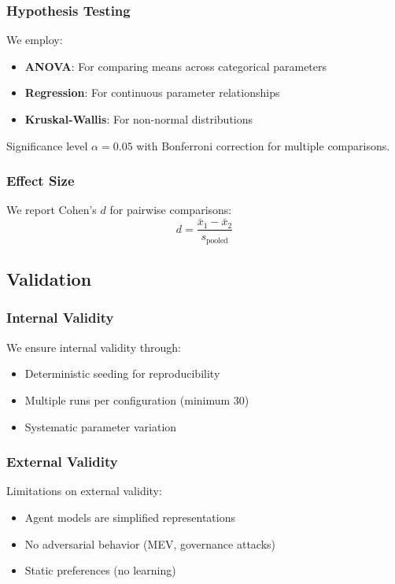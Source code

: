 \subsubsection{Hypothesis Testing}

We employ:
\begin{itemize}
    \item \textbf{ANOVA}: For comparing means across categorical parameters
    \item \textbf{Regression}: For continuous parameter relationships
    \item \textbf{Kruskal-Wallis}: For non-normal distributions
\end{itemize}

Significance level $\alpha = 0.05$ with Bonferroni correction for multiple comparisons.

\subsubsection{Effect Size}

We report Cohen's $d$ for pairwise comparisons:
\begin{equation}
d = \frac{\bar{x}_1 - \bar{x}_2}{s_{\text{pooled}}}
\end{equation}

\subsection{Validation}

\subsubsection{Internal Validity}

We ensure internal validity through:
\begin{itemize}
    \item Deterministic seeding for reproducibility
    \item Multiple runs per configuration (minimum 30)
    \item Systematic parameter variation
\end{itemize}

\subsubsection{External Validity}

Limitations on external validity:
\begin{itemize}
    \item Agent models are simplified representations
    \item No adversarial behavior (MEV, governance attacks)
    \item Static preferences (no learning)
\end{itemize}

